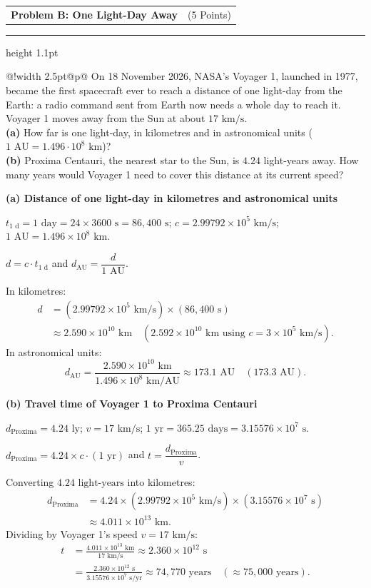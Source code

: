 \documentclass[11pt, a4paper]{article}
\makeatletter
\newcommand{\problemheader}[2]{%
    \par\noindent{\footnotesize\bfseries\color{goldaccent} \MakeUppercase{#1}}\par
    \vspace{2pt}
    \noindent\begin{tabularx}{\textwidth}{@{}X r@{}}
        {\fontsize{18}{22}\selectfont\bfseries\color{navyaccent} #1} & {\normalsize\normalfont\color{iaacgray} (#2)}
    \end{tabularx}\par
    \vspace{4pt}
    {\color{navyaccent}\hrule height 1.1pt}
    \vspace{10pt}
}
\newcommand{\questionbox}[1]{%
    \par\noindent\begin{tabular}{@{}!{\color{navyaccent}\vrule width 2.5pt}@{\hspace{10pt}}p{\dimexpr\textwidth-12.5pt\relax}@{}}
        \normalsize\color{iaacblack}#1
    \end{tabular}\par
    \vspace{10pt}
}
\newcommand{\subquestion}[1]{%
    \vspace{14pt}
    \noindent\textbf{\large\color{navyaccent}#1}
    \vspace{4pt}
}
\newcommand{\gfsblock}[3]{%
    \begin{description}[leftmargin=2.1cm, labelwidth=1.9cm, labelsep=0.2cm, itemsep=5pt, topsep=3pt, parsep=3pt, align=left]
        \item[\textbf{\color{navyaccent}Given:}] #1
        \item[\textbf{\color{navyaccent}Formula:}] #2
        \item[\textbf{\color{navyaccent}Solution:}] #3
    \end{description}
    \vspace{8pt}
}
\makeatother
\begin{document}
\label{sec:probB}
\problemheader{Problem B: One Light-Day Away}{5 Points}

\questionbox{%
    On 18 November 2026, NASA's Voyager 1, launched in 1977, became the first spacecraft ever to reach a distance of one light-day from the Earth: a radio command sent from Earth now needs a whole day to reach it. Voyager 1 moves away from the Sun at about $17\text{ km/s}$.\\[6pt]
    \textbf{(a)} How far is one light-day, in kilometres and in astronomical units ($1\text{ AU} = 1.496 \cdot 10^{8}\text{ km}$)?\\[4pt]
    \textbf{(b)} Proxima Centauri, the nearest star to the Sun, is $4.24$ light-years away. How many years would Voyager 1 need to cover this distance at its current speed?
}

\subquestion{(a) Distance of one light-day in kilometres and astronomical units}
\gfsblock
{$t_{1\text{ d}} = 1\text{ day} = 24 \times 3600\text{ s} = 86{,}400\text{ s}$; \quad $c = 2.99792 \times 10^{5}\text{ km/s}$; \quad $1\text{ AU} = 1.496 \times 10^{8}\text{ km}$.}
{$d = c \cdot t_{1\text{ d}}$ \quad and \quad $d_{\text{AU}} = \dfrac{d}{1\text{ AU}}$.}
{In kilometres:
\begin{align*}
d &= (2.99792 \times 10^{5}\text{ km/s}) \times (86{,}400\text{ s}) \\
  &\approx 2.590 \times 10^{10}\text{ km} \quad (2.592 \times 10^{10}\text{ km using } c = 3 \times 10^{5}\text{ km/s}).
\end{align*}
In astronomical units:
\[
d_{\text{AU}} = \frac{2.590 \times 10^{10}\text{ km}}{1.496 \times 10^{8}\text{ km/AU}} \approx 173.1\text{ AU} \quad (173.3\text{ AU}).
\]}

\subquestion{(b) Travel time of Voyager 1 to Proxima Centauri}
\gfsblock
{$d_{\text{Proxima}} = 4.24\text{ ly}$; \quad $v = 17\text{ km/s}$; \quad $1\text{ yr} = 365.25\text{ days} = 3.15576 \times 10^{7}\text{ s}$.}
{$d_{\text{Proxima}} = 4.24 \times c \cdot (1\text{ yr})$ \quad and \quad $t = \dfrac{d_{\text{Proxima}}}{v}$.}
{Converting $4.24\text{ light-years}$ into kilometres:
\begin{align*}
d_{\text{Proxima}} &= 4.24 \times (2.99792 \times 10^{5}\text{ km/s}) \times (3.15576 \times 10^{7}\text{ s}) \\
                   &\approx 4.011 \times 10^{13}\text{ km}.
\end{align*}
Dividing by Voyager 1's speed $v = 17\text{ km/s}$:
\begin{align*}
t &= \frac{4.011 \times 10^{13}\text{ km}}{17\text{ km/s}} \approx 2.360 \times 10^{12}\text{ s} \\
  &= \frac{2.360 \times 10^{12}\text{ s}}{3.15576 \times 10^{7}\text{ s/yr}} \approx 74{,}770\text{ years} \quad (\approx 75{,}000\text{ years}).
\end{align*}}
\end{document}
